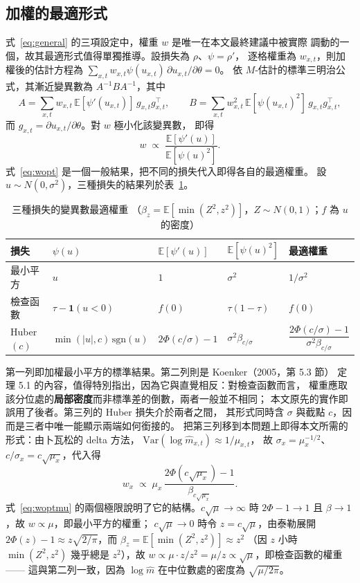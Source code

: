 \documentclass[UTF8, fontset=macnew, a4paper, 12pt]{ctexart}
\newcommand{\Ex}{\mathbb{E}}
\begin{document}
\subsection{加權的最適形式}\label{sec:weight}

式~\eqref{eq:general} 的三項設定中，權重 $w$ 是唯一在本文最終建議中被實際
調動的一個，故其最適形式值得單獨推導。設損失為 $\rho$、$\psi=\rho'$，
逐格權重為 $w_{x,t}$，則加權後的估計方程為
$\sum_{x,t}w_{x,t}\psi(u_{x,t})\,\partial u_{x,t}/\partial\theta=0$。
依 $M$-估計的標準三明治公式，其漸近變異數為 $A^{-1}BA^{-1}$，其中
\[
A=\sum_{x,t} w_{x,t}\,\Ex[\psi'(u_{x,t})]\,g_{x,t}g_{x,t}^{\top},\qquad
B=\sum_{x,t} w_{x,t}^{2}\,\Ex[\psi(u_{x,t})^{2}]\,g_{x,t}g_{x,t}^{\top},
\]
而 $g_{x,t}=\partial u_{x,t}/\partial\theta$。對 $w$ 極小化該變異數，
即得
\begin{equation}\label{eq:wopt}
w\;\propto\;\frac{\Ex[\psi'(u)]}{\Ex[\psi(u)^{2}]} .
\end{equation}
式~\eqref{eq:wopt} 是一個一般結果，把不同的損失代入即得各自的最適權重。
設 $u\sim N(0,\sigma^2)$，三種損失的結果列於表~\ref{tab:wcases}。

\begin{table}[H]
\centering
\caption{三種損失的變異數最適權重
（$\beta_z=\Ex[\min(Z^2,z^2)]$，$Z\sim N(0,1)$；$f$ 為 $u$ 的密度）}
\small
\begin{tabular}{lllll}
\toprule
損失 & $\psi(u)$ & $\Ex[\psi'(u)]$ & $\Ex[\psi(u)^2]$ & 最適權重\\
\midrule
最小平方 & $u$ & $1$ & $\sigma^2$ & $1/\sigma^2$\\
檢查函數 & $\tau-\mathbf{1}(u<0)$ & $f(0)$ & $\tau(1-\tau)$ & $f(0)$\\
Huber$(c)$ & $\min(|u|,c)\,\mathrm{sgn}(u)$ & $2\Phi(c/\sigma)-1$
  & $\sigma^2\beta_{c/\sigma}$ & $\dfrac{2\Phi(c/\sigma)-1}{\sigma^2\beta_{c/\sigma}}$\\
\bottomrule
\end{tabular}
\label{tab:wcases}
\end{table}

第一列即加權最小平方的標準結果。第二列則是 Koenker（2005，第 5.3 節）
定理 5.1 的內容，值得特別指出，因為它與直覺相反：對檢查函數而言，
權重應取該分位處的\textbf{局部密度}而非標準差的倒數，兩者一般並不相同；
本文原先的實作即誤用了後者。第三列的 Huber 損失介於兩者之間，
其形式同時含 $\sigma$ 與截點 $c$，因而是三者中唯一能顯示兩端如何銜接的。
把第三列移到本問題上即得本文所需的形式：由卜瓦松的 delta 方法，
$\mathrm{Var}(\log\hat m_{x,t})\approx1/\mu_{x,t}$，
故 $\sigma_x=\mu_x^{-1/2}$、$c/\sigma_x=c\sqrt{\mu_x}$，代入得
\begin{equation}\label{eq:woptmu}
w_x\;\propto\;\mu_x\,\frac{2\Phi(c\sqrt{\mu_x})-1}{\beta_{c\sqrt{\mu_x}}} .
\end{equation}
式~\eqref{eq:woptmu} 的兩個極限說明了它的結構。$c\sqrt{\mu}\to\infty$ 時
$2\Phi-1\to1$ 且 $\beta\to1$，故 $w\propto\mu$，即最小平方的權重；
$c\sqrt{\mu}\to0$ 時令 $z=c\sqrt{\mu}$，由泰勒展開
$2\Phi(z)-1\approx z\sqrt{2/\pi}$，而 $\beta_z=\Ex[\min(Z^2,z^2)]\approx z^2$
（因 $z$ 小時 $\min(Z^2,z^2)$ 幾乎總是 $z^2$），故
$w\propto\mu\cdot z/z^{2}=\mu/z\propto\sqrt{\mu}$，即檢查函數的權重——
這與第二列一致，因為 $\log\hat m$ 在中位數處的密度為 $\sqrt{\mu/2\pi}$。
\end{document}
